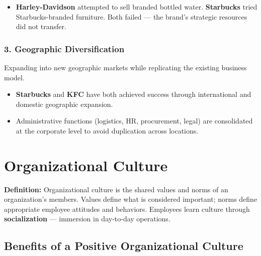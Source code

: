 \documentclass[11pt, letterpaper]{article}
\begin{document}
\begin{itemize}[leftmargin=*]
  \item \textbf{Harley-Davidson} attempted to sell branded bottled water. \textbf{Starbucks} tried Starbucks-branded furniture. Both failed --- the brand's strategic resources did not transfer.
\end{itemize}

\subsubsection{3. Geographic Diversification}
Expanding into new geographic markets while replicating the existing business model.

\begin{itemize}[leftmargin=*]
  \item \textbf{Starbucks} and \textbf{KFC} have both achieved success through international and domestic geographic expansion.
  \item Administrative functions (logistics, HR, procurement, legal) are consolidated at the corporate level to avoid duplication across locations.
\end{itemize}

\newpage

\section{Organizational Culture}

\begin{defbox}
\textbf{Definition:} Organizational culture is the shared values and norms of an organization's members. Values define what is considered important; norms define appropriate employee attitudes and behaviors. Employees learn culture through \textbf{socialization} --- immersion in day-to-day operations.
\end{defbox}

\subsection{Benefits of a Positive Organizational Culture}
\end{document}
